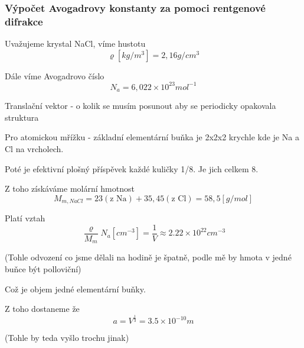 \documentclass[../main.tex]{subfiles}
\begin{document}
\subsubsection{Výpočet Avogadrovy konstanty za pomoci rentgenové difrakce}

Uvažujeme krystal NaCl, víme hustotu
\begin{equation}
    \varrho [kg/m^3] = 2,16 g/cm^3 
\end{equation}

Dále víme Avogadrovo číslo
\begin{equation}
    N_a = 6,022 \times 10^{23} mol^{-1}
\end{equation}




Translační vektor - o kolik se musím posunout aby se periodicky opakovala struktura

Pro atomickou mřížku - základní elementární buňka je 2x2x2 krychle kde je Na a Cl na vrcholech.

Poté je efektivní plošný příspěvek každé kuličky 1/8. Je jich celkem 8.

Z toho získáváme molární hmotnost
\begin{equation}
    M_{m, NaCl} = 23 (\text{z Na}) + 35,45 (\text{z Cl}) = 58,5 [g/mol]
\end{equation}


Platí vztah
\begin{equation}
    \frac{\varrho}{M_m} N_a [cm^{-3}] = \frac{1}{V}  \approx 2.22 \times 10^{22} cm^{-3}
\end{equation}

(Tohle odvození co jsme dělali na hodině je špatně, podle mě by hmota v jedné buňce být polloviční)

Což je objem jedné elementární buňky. 

Z toho dostaneme že
\begin{equation}
    a = V^{\frac{1}{3}} = 3.5 \times10^{-10} m
\end{equation}

(Tohle by teda vyšlo trochu jinak)
\end{document}

